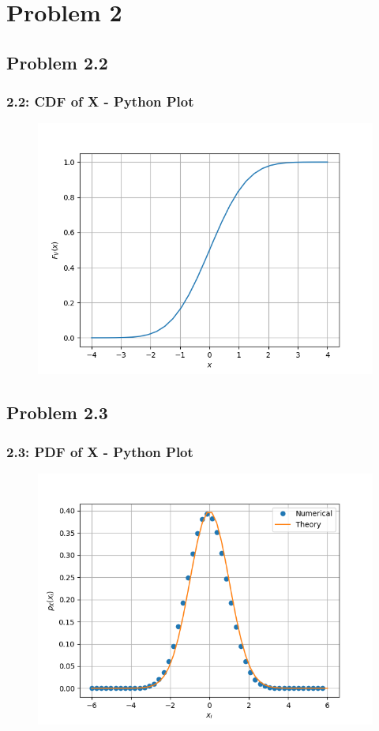 \documentclass{beamer}
\begin{document}
\section{Problem 2}

\subsection{Problem 2.2}
\begin{frame}
	\frametitle{2.2: CDF of X - Python Plot}
	\begin{figure}
		\centerline{\includegraphics[width=\textheight]{../figs/gau_cdf.png}}
		\label{fig3}
	\end{figure}
	
\end{frame}	

\subsection{Problem 2.3}
\begin{frame}
	\frametitle{2.3: PDF of X - Python Plot}
	\begin{figure}
		\centerline{\includegraphics[width=\textheight]{../figs/gauss_pdf.png}}
		\label{fig4}
	\end{figure}
	
\end{frame}
\end{document}
